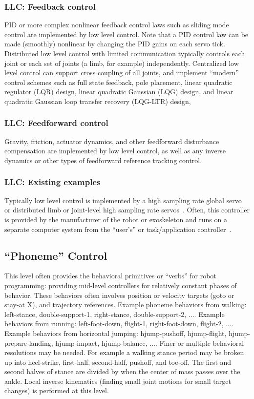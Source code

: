 \documentclass[letterpaper,12pt,fullpage]{article}
\begin{document}
\subsubsection{LLC: Feedback control}

PID or more complex nonlinear feedback control laws such as sliding mode control
are implemented by low level control. Note that a PID control law can be made
(smoothly) nonlinear by changing the PID gains on each servo tick.
Distributed low level control with limited communication typically controls each
joint or each set of joints (a limb, for example) independently.
Centralized low level control can support cross coupling of all joints,
and implement ``modern'' control schemes such as full state feedback,
pole placement, linear quadratic regulator (LQR) design, linear quadratic
Gaussian (LQG) design, and linear quadratic Gaussian loop transfer recovery
(LQG-LTR) design,

\subsubsection{LLC: Feedforward control}

Gravity, friction, actuator dynamics, and other feedforward disturbance
compensation are implemented by low level control, as well as any inverse dynamics
or other types of feedforward reference tracking control.

\subsubsection{LLC: Existing examples}

Typically low level control is implemented
by a high sampling rate global servo~\cite{Atlas-robot}
or distributed limb or joint-level high sampling rate servos~\cite{Sarcos-robot}.
Often, this controller is provided by the manufacturer of the robot
or exoskeleton and runs on a separate computer system from the
``user's'' or task/application controller~\cite{Sarcos,Atlas}.

\subsection{``Phoneme'' Control}

This level often provides the behavioral primitives or ``verbs'' for robot programming:
providing mid-level controllers
for relatively constant phases of behavior.
These behaviors often involves position or velocity targets (goto or
stay-at X), and trajectory references.
Example phoneme behaviors from walking: left-stance, double-support-1, right-stance, double-support-2, ....
Example behaviors from running: left-foot-down, flight-1, right-foot-down, flight-2, ....
Example behaviors from horizontal jumping: hjump-pushoff, hjump-flight, hjump-prepare-landing, hjump-impact, hjump-balance, ....
Finer or multiple behavioral resolutions may be needed.
For example a walking stance period may
be broken up into heel-strike, first-half, second-half, pushoff, and toe-off.
The first and second halves of stance are divided by when the center of mass
passes over the ankle.
Local inverse kinematics (finding small joint motions for small target changes)
is performed at this level.
\end{document}
